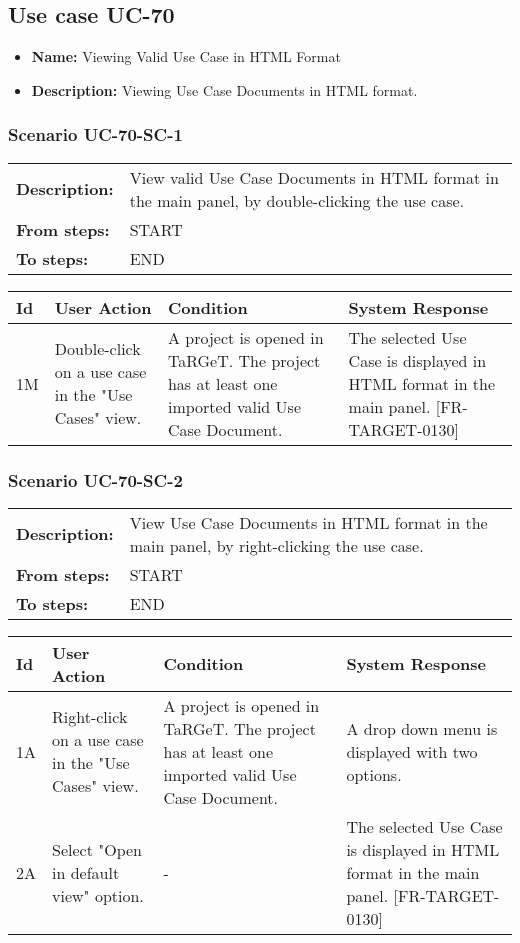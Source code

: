 \documentclass[a4paper,11pt]{article}
\newcommand{\bl}{\\ \hline}
\begin{document}
\subsection*{Use case UC-70}
\begin{itemize}
\item {\bf Name: }Viewing Valid Use Case in HTML Format
\item {\bf Description: }Viewing Use Case Documents in HTML format.
\end{itemize}
\subsubsection*{Scenario UC-70-SC-1}
\begin{tabular}{p{1in}p{4in}}
{\bf Description:} & View valid Use Case Documents in HTML format in the main panel, by double-clicking the use case. \\
{\bf From steps:} & START \\
{\bf To steps:} & END \\
\end{tabular}
 
\begin{tabular}{|p{0.8in}|p{1.6in}|p{1.6in}|p{1.6in}|}
\hline
Id & User Action & Condition & System Response  \bl 
1M & Double-click on a use case in the "Use Cases" view. & A project is opened in TaRGeT. The project has at least one imported valid Use Case Document. & The selected Use Case is displayed in HTML format in the main panel. [FR-TARGET-0130] \bl 
\end{tabular}
\subsubsection*{Scenario UC-70-SC-2}
\begin{tabular}{p{1in}p{4in}}
{\bf Description:} & View Use Case Documents in HTML format in the main panel, by right-clicking the use case. \\
{\bf From steps:} & START \\
{\bf To steps:} & END \\
\end{tabular}
 
\begin{tabular}{|p{0.8in}|p{1.6in}|p{1.6in}|p{1.6in}|}
\hline
Id & User Action & Condition & System Response  \bl 
1A & Right-click on a use case in the "Use Cases" view. & A project is opened in TaRGeT. The project has at least one imported valid Use Case Document. & A drop down menu is displayed with two options. \bl 
2A & Select "Open in default view" option. & - & The selected Use Case is displayed in HTML format in the main panel. [FR-TARGET-0130] \bl 
\end{tabular}
\end{document}
